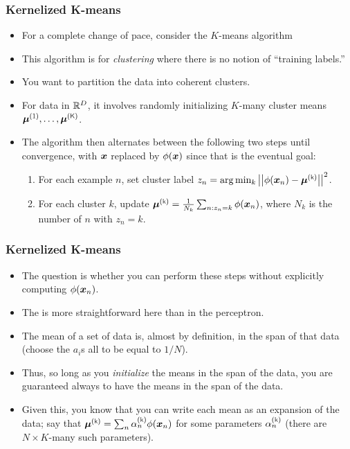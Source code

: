\documentclass[trans]{beamer}
\begin{document}
\begin{frame}
  \frametitle{Kernelized K-means}
\begin{itemize}
\item 
For a complete change of pace, consider the $K$-means algorithm
\item This algorithm is for \emph{clustering}
where there is no notion of ``training labels.''  
\item You want to
partition the data into coherent clusters. 
\item  For data in $\mathbb{R}^D$, it
involves randomly initializing $K$-many cluster means $\vec\mu\oth,
\dots, \vec\mu\Kth$.  
\item The algorithm then alternates between the
following two steps until convergence, with ${\boldsymbol{x}}$ replaced by
$\phi({\boldsymbol{x}})$ since that is the eventual goal:
\begin{enumerate}
\item For each example $n$, set cluster label $z_n = \arg\min_k
  \norm{\phi(\vx_n) - \vec\mu\kth}^2$.
\item For each cluster $k$, update $\vec\mu\kth = \frac 1 {N_k}
  \sum_{n : z_n=k} \phi(\vx_n)$, where $N_k$ is the number of $n$ with
  $z_n=k$.
\end{enumerate}
\end{itemize}
\end{frame}
\begin{frame}
  \frametitle{Kernelized K-means}
\begin{itemize}
\item 
The question is whether you can perform these steps without explicitly
computing $\phi({\boldsymbol{x}}_n)$. 
\item The  is more
straightforward here than in the perceptron.
\item  The mean of a set of
data is, almost by definition, in the span of that data (choose the
$a_i$s all to be equal to $1/N$).  
\item Thus, so long as you
\emph{initialize} the means in the span of the data, you are
guaranteed always to have the means in the span of the data. 
\item  Given
this, you know that you can write each mean as an expansion of the
data; say that $\vec\mu\kth = \sum_n \al\kth_n \phi(\vx_n)$ for some
parameters $\al\kth_n$ (there are $N\times K$-many such parameters).
\end{itemize}
\end{frame}
\end{document}
